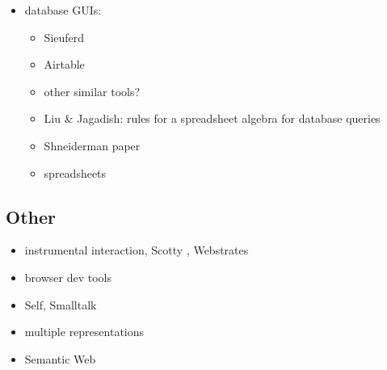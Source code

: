 \documentclass[sigplan,10pt,anonymous,review]{acmart}
\providecommand{\tightlist}{%
  \setlength{\itemsep}{0pt}\setlength{\parskip}{0pt}}
\begin{document}
\begin{itemize}
\tightlist
\item
  database GUIs:

  \begin{itemize}
  \tightlist
  \item
    Sieuferd \citep{bakke2016}
  \item
    Airtable \citep{2020a}
  \item
    other similar tools?
  \item
    Liu \& Jagadish: rules for a spreadsheet algebra for database
    queries \citep{liu2009}
  \item
    Shneiderman paper
  \item
    spreadsheets
  \end{itemize}
\end{itemize}

\hypertarget{other}{%
\subsection{Other}\label{other}}

\begin{itemize}
\tightlist
\item
  instrumental interaction, Scotty \citep{eagan2011}, Webstrates
\item
  browser dev tools
\item
  Self, Smalltalk
\item
  multiple representations
\item
  Semantic Web
\end{itemize}



\end{document}
